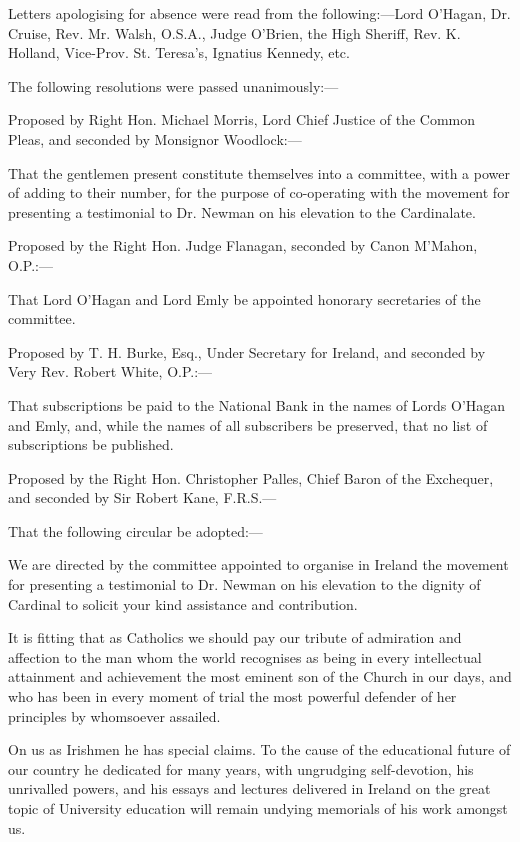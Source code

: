 Letters apologising for absence were read from the following:—Lord
O'Hagan, Dr. Cruise, Rev. Mr. Walsh, O.S.A., Judge O'Brien, the High
Sheriff, Rev. K. Holland, Vice-Prov. St. Teresa's, Ignatius Kennedy,
etc.

The following resolutions were passed unanimously:—

Proposed by Right Hon. Michael Morris, Lord Chief Justice of the
Common Pleas, and seconded by Monsignor Woodlock:—

That the gentlemen present constitute themselves into a committee,
with a power of adding to their number, for the purpose of
co-operating with the movement for presenting a testimonial to Dr.
Newman on his elevation to the Cardinalate.

Proposed by the Right Hon. Judge Flanagan, seconded by Canon M'Mahon,
O.P.:—

That Lord O'Hagan and Lord Emly be appointed honorary secretaries of
the committee.

Proposed by T. H. Burke, Esq., Under Secretary for Ireland, and
seconded by Very Rev. Robert White, O.P.:—

That subscriptions be paid to the National Bank in the names of Lords
O'Hagan and Emly, and, while the names of all subscribers be
preserved, that no list of subscriptions be published.

Proposed by the Right Hon. Christopher Palles, Chief Baron of the
Exchequer, and seconded by Sir Robert Kane, F.R.S.—

That the following circular be adopted:—

We are directed by the committee appointed to organise in Ireland the
movement for presenting a testimonial to Dr. Newman on his elevation
to the dignity of Cardinal to solicit your kind assistance and
contribution.

It is fitting that as Catholics we should pay our tribute of
admiration and affection to the man whom the world recognises as being
in every intellectual attainment and achievement the most eminent son
of the Church in our days, and who has been in every moment of trial
the most powerful defender of her principles by whomsoever assailed.

On us as Irishmen he has special claims. To the cause of the
educational future of our country he dedicated for many years, with
ungrudging self-devotion, his unrivalled powers, and his essays and
lectures delivered in Ireland on the great topic of University
education will remain undying memorials of his work amongst us.

